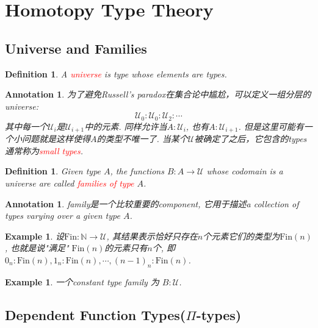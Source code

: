 \documentclass{article}
\newtheorem{example}[theorem]{Example}
\newtheorem{definition}[theorem]{Definition}
\newtheorem{annotation}[theorem]{Annotation}
\newcommand{\redt}[1]{\textcolor{red}{#1}}
\begin{document}
\newpage
\section{Homotopy Type Theory}

\subsection{Universe and Families}

\begin{definition}
\rm A \redt{universe} is type whose elements are types.
\end{definition}

\begin{annotation}
\rm 为了避免Russell's paradox在集合论中尴尬，可以定义一组分层的universe:
\[
	\mathcal{U}_0 : \mathcal{U}_0 :\mathcal{U}_2 : \cdots
\]
其中每一个$\mathcal{U}_i$是$\mathcal{U}_{i+1}$中的元素. 同样允许当$A:\mathcal{U}_i$, 也有$A : \mathcal{U}_{i+1}$. 但是这里可能有一个小问题就是这样使得$A$的类型不唯一了. 当某个$\mathcal{U}$被确定了之后，它包含的types通常称为\redt{small types}.
\end{annotation}

\begin{definition}
\rm Given type $A$, the functions $B: A \to \mathcal{U}$ whose codomain is a universe are called \redt{families of type} $A$.
\end{definition}

\begin{annotation}
\rm family是一个比较重要的component, 它用于描述a collection of types varying over a given type $A$.
\end{annotation}

\begin{example}\label{ex:family_fin}
\rm 设$\text{Fin}:\mathbb{N} \to \mathcal{U}$, 其结果表示恰好只存在$n$个元素它们的类型为$\text{Fin}(n)$, 也就是说"满足" $\text{Fin}(n)$的元素只有$n$个, 即$0_{n}: \text{Fin}(n), 1_{n}: \text{Fin}(n), \cdots, (n-1)_n : \text{Fin}(n)$.
\end{example}


\begin{example}
\rm 一个constant type family 为 $B:\mathcal{U}$. 
\end{example}

\subsection{Dependent Function Types(\texorpdfstring{$\Pi$}{pi}-types)}
\end{document}
